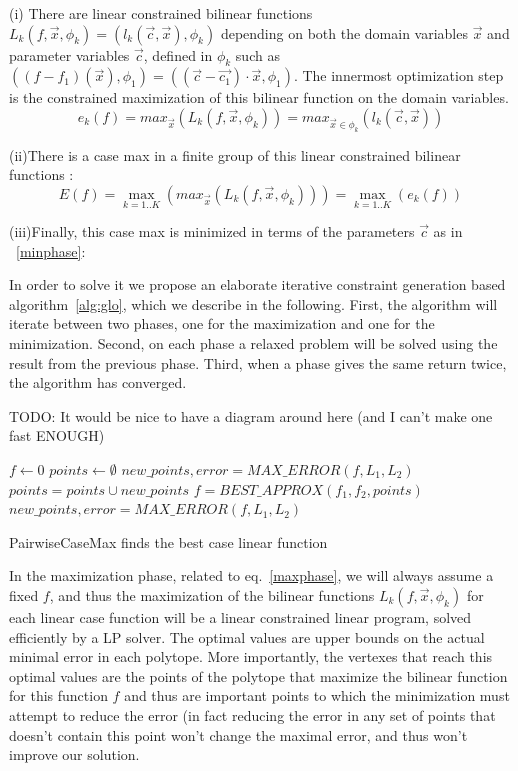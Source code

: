 (i) There are linear constrained bilinear functions $L_{k}(f,\vec{x},\phi_k) =  ( l_k(\vec{c},\vec{x}) ,\phi_k)$ depending on both the domain variables $\vec{x}$ and parameter variables $\vec{c}$, defined in $\phi_k$ such as $ ( (f - f_1)(\vec{x}),\phi_1) = ( (\vec{c}-\vec{c_1})\cdot\vec{x}, \phi_1)$. The innermost optimization step is the constrained maximization of this bilinear function on the domain variables.
\begin{equation} e_k(f) = max_{\vec{x}} ( L_k(f,\vec{x},\phi_k) ) = max_{ {\vec{x}} \in \phi_k} (l_k (\vec{c}, \vec{x}) ) \label{optim1} \nonumber \end{equation}

(ii)There is a case max in a finite group of this linear constrained bilinear functions :
\begin{equation} E(f) = \max_{k=1..K} ( max_{\vec{x}} ( L_k(f,\vec{x},\phi_k) )) = \max_{k=1..K} ( e_k(f)) \label{optim2}  \nonumber \end{equation}

(iii)Finally, this case max is minimized in terms of the parameters $\vec{c}$ as in ~\ref{minphase}:

In order to solve it we propose an elaborate iterative constraint generation based algorithm~\ref{alg:glo}, which we describe in the following.
First, the algorithm will iterate between two phases, one for the maximization and one for the minimization.  Second, on each phase a relaxed problem will be solved using the result from the previous phase. Third, when a phase gives the same return twice, the algorithm has converged.

TODO: It would be nice to have a diagram around here (and I can't make one fast ENOUGH)

\begin{algorithm}[!ht]
\dontprintsemicolon
{}
$f \gets 0$\;
$points \gets \emptyset$\;
$new\_points, error = MAX\_ERROR(f, L_1,L_2)$\;
 {
	$points = points \cup new\_points$\;
	$f = BEST\_APPROX(f_1,f_2,points)$\;
	$new\_points, error = MAX\_ERROR(f, L_1,L_2)$\;}
\;
\caption{{\sc PairwiseCaseMax} finds the best case linear function}
\label{alg:glo}
\end{algorithm}


In the maximization phase, related to eq.~\ref{maxphase}, we will always assume a fixed $f$, and thus the maximization of the bilinear functions $L_{k}(f,\vec{x},\phi_k)$ for each linear case function will be a linear constrained linear program, solved efficiently by a LP solver. The optimal values are upper bounds on the actual minimal error in each polytope. More importantly, the vertexes that reach this optimal values are the points of the polytope that maximize the bilinear function for this function $f$ and thus are important points to which the minimization must attempt to reduce the error (in fact reducing the error in any set of points that doesn't contain this point won't change the maximal error, and thus won't improve our solution.

